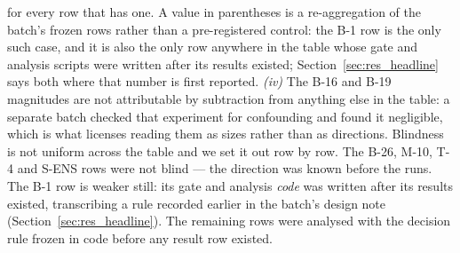 \documentclass[review]{elsarticle}
\begin{document}
for every row that has one. A value in parentheses is a re-aggregation of the
batch's frozen rows rather than a pre-registered control: the B-1 row is the only
such case, and it is also the only row anywhere in the table whose gate and analysis
scripts were written after its results existed; Section~\ref{sec:res_headline} says
both where that number is first reported. \emph{(iv)} The B-16 and
B-19 magnitudes are not attributable by subtraction from anything else in the
table: a separate batch checked that experiment for confounding and found it
negligible, which is what licenses reading them as sizes rather than as directions.
Blindness is not uniform across the table and we set it out row by row. The B-26,
M-10, T-4 and S-ENS rows were not blind --- the direction was known before the runs.
The
B-1 row is weaker still: its gate and analysis \emph{code} was written after its
results existed, transcribing a rule recorded earlier in the batch's design note
(Section~\ref{sec:res_headline}). The remaining rows were analysed with the decision
rule frozen in code before any result row existed.
\end{document}
